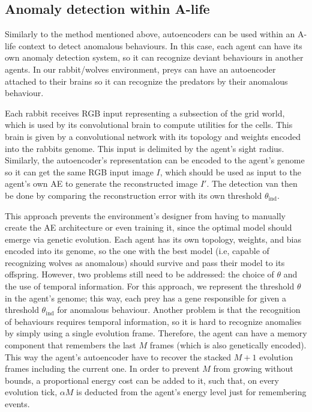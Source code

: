 \documentclass[letterpaper]{article}
\numberwithin{equation}{section}
\numberwithin{theorem}{section}
\numberwithin{lemma}{section}
\numberwithin{df}{section}
\begin{document}
\subsection{Anomaly detection within A-life}

Similarly to the method mentioned above, autoencoders can be used within an A-life context to detect anomalous behaviours. In this case, each agent can have its own anomaly detection system, so it can recognize deviant behaviours in another agents.  In our rabbit/wolves environment, preys can have an autoencoder attached to their brains so it can recognize the predators by their anomalous behaviour.

Each rabbit receives RGB input representing a subsection of the grid world, which is used by its convolutional brain to compute utilities for the cells. This brain is given by a convolutional network with its topology and weights encoded into the rabbits genome. This input is delimited by the agent's sight radius. Similarly, the autoencoder's representation can be encoded to the agent's genome so it can get the same RGB input image $I$, which should be used as input to the agent's own AE to generate the reconstructed image $I'$. The detection van then be done by comparing the reconstruction error with its own threshold $\theta_\text{ind}$.

This approach prevents the environment's designer from having to manually create the AE architecture or even training it, since the optimal model should emerge via genetic evolution. Each agent has its own topology, weights, and bias encoded into its genome, so the one with the best model (i.e, capable of recognizing wolves as anomalous) should survive and pass their model to its offspring. However, two problems still need to be addressed: the choice of $\theta$ and the use of temporal information. For this approach, we represent the threshold $\theta$ in the agent's genome; this way, each prey has a gene responsible for given a threshold $\theta_\text{ind}$ for anomalous behaviour. Another problem is that the recognition of behaviours requires temporal information, so it is hard to recognize anomalies by simply using a single evolution frame. Therefore, the agent can have a memory component that remembers the last $M$ frames (which is also genetically encoded). This way the agent's autoencoder have to recover the stacked $M+1$ evolution frames including the current one. In order to prevent $M$ from growing without bounds, a proportional energy cost can be added to it, such that, on every evolution tick, $\alpha M$ is deducted from the agent's energy level just for remembering events.
\end{document}
